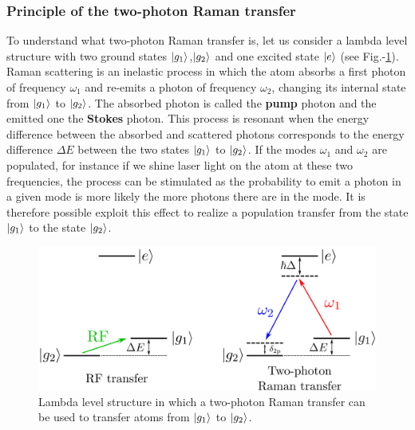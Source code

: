  

\subsubsection{Principle of the two-photon Raman transfer}


To understand what two-photon Raman transfer is, let us consider a lambda level structure with two ground states $\ket{g_1}$,$\ket{g_2}$ and one excited state $\ket{e}$ (see Fig.-\ref{fig:raman_level}). Raman scattering is an inelastic process in which the atom absorbs a first photon of frequency $\omega_1$ and re-emits a photon of frequency $\omega_2$, changing its internal state from $\ket{g_1}$ to $\ket{g_2}$. The absorbed photon is called the \textbf{pump} photon and the emitted one the \textbf{Stokes} photon. This process is resonant when the energy difference between the absorbed and scattered photons corresponds to the energy difference $\Delta E$ between the two states $\ket{g_1}$ to $\ket{g_2}$. If the modes $\omega_1$ and $\omega_2$ are populated, for instance if we shine laser light on the atom at these two frequencies, the process can be stimulated as the probability to emit a photon in a given mode is more likely the more photons there are in the mode. It is therefore possible exploit this effect to realize a population transfer from the state $\ket{g_1}$ to the state $\ket{g_2}$.


\begin{figure}
    \centering
    \includegraphics[width=\textwidth]{Fig/Chapter3/raman_level.png}
    \caption[Lambda level structure for two-photon Raman transfer]{Lambda level structure in which a two-photon Raman transfer can be used to transfer atoms from $\ket{g_1}$ to $\ket{g_2}$.}
    \label{fig:raman_level}
\end{figure}

